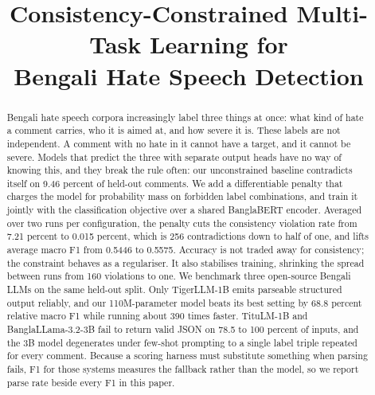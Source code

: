 \documentclass[conference]{IEEEtran}
\begin{document}
\title{Consistency-Constrained Multi-Task Learning for\\Bengali Hate Speech Detection}

\author{
\and
{}
}

\maketitle

\begin{abstract}
Bengali hate speech corpora increasingly label three things at once: what kind of hate a comment carries, who it is aimed at, and how severe it is. These labels are not independent. A comment with no hate in it cannot have a target, and it cannot be severe. Models that predict the three with separate output heads have no way of knowing this, and they break the rule often: our unconstrained baseline contradicts itself on 9.46 percent of held-out comments. We add a differentiable penalty that charges the model for probability mass on forbidden label combinations, and train it jointly with the classification objective over a shared BanglaBERT encoder. Averaged over two runs per configuration, the penalty cuts the consistency violation rate from 7.21 percent to 0.015 percent, which is 256 contradictions down to half of one, and lifts average macro F1 from 0.5446 to 0.5575. Accuracy is not traded away for consistency; the constraint behaves as a regulariser. It also stabilises training, shrinking the spread between runs from 160 violations to one. We benchmark three open-source Bengali LLMs on the same held-out split. Only TigerLLM-1B emits parseable structured output reliably, and our 110M-parameter model beats its best setting by 68.8 percent relative macro F1 while running about 390 times faster. TituLM-1B and BanglaLLama-3.2-3B fail to return valid JSON on 78.5 to 100 percent of inputs, and the 3B model degenerates under few-shot prompting to a single label triple repeated for every comment. Because a scoring harness must substitute something when parsing fails, F1 for those systems measures the fallback rather than the model, so we report parse rate beside every F1 in this paper.
\end{abstract}
\end{document}
